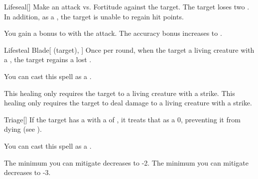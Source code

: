 \lowercase{\hypertarget{spell:Lifeseal}{}}\label{spell:Lifeseal}
\begin{freeability}[Rank 4]{\hypertarget{spell:Lifeseal}{Lifeseal}}[]
Make an attack vs. Fortitude against the target.
\hit The target loses two .
In addition, as a , the target is unable to regain hit points.

\rankline
{} You gain a  bonus to  with the attack.
 The accuracy bonus increases to .
\end{freeability}
\vspace{0.25em}



\lowercase{\hypertarget{spell:Lifesteal Blade}{}}\label{spell:Lifesteal Blade}
\begin{attuneability}[Rank 4]{\hypertarget{spell:Lifesteal Blade}{Lifesteal Blade}}[ (target), ]
Once per round, when the target  a living creature with a , the target regains a lost .

You can cast this spell as a .

\rankline
{} This healing only requires the target to  a living creature with a strike.
 This healing only requires the target to deal damage to a living creature with a strike.
\end{attuneability}
\vspace{0.25em}



\lowercase{\hypertarget{spell:Triage}{}}\label{spell:Triage}
\begin{freeability}[Rank 4]{\hypertarget{spell:Triage}{Triage}}[]
If the target has a  with a  of , it treats that  as a 0, preventing it from dying (see ).

You can cast this spell as a .

\rankline
{} The minimum  you can mitigate decreases to -2.
 The minimum  you can mitigate decreases to -3.
\end{freeability}
\vspace{0.25em}



